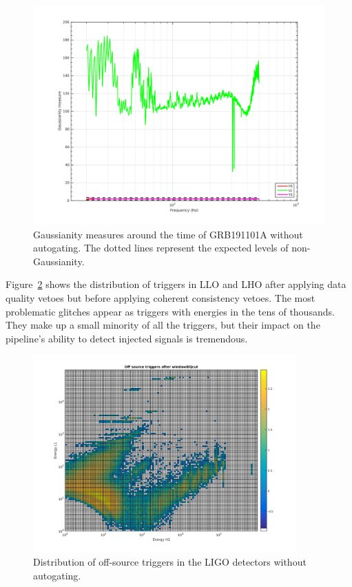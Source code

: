 \begin{figure}[htb]
	\includegraphics[trim={2cm 1.2cm 2cm 1.5cm}, clip, width=\textwidth]{figures/grb/gauss-before.png}
	\caption{Gaussianity measures around the time of GRB191101A without autogating. The dotted lines represent the expected levels of non-Gaussianity.}
	\label{fig:gauss-before}
\end{figure}

Figure~\ref{fig:triggers-before} shows the distribution of triggers in LLO and LHO after applying data quality vetoes but before applying coherent consistency vetoes.
The most problematic glitches appear as triggers with energies in the tens of thousands.
They make up a small minority of all the triggers, but their impact on the pipeline's ability to detect injected signals is tremendous.

\begin{figure}[htb]
	\includegraphics[trim={2cm 1.2cm 2cm 1.2cm}, clip, width=0.9\textwidth]{figures/grb/triggers-before.png}
	\caption{Distribution of off-source triggers in the LIGO detectors without autogating.}
	\label{fig:triggers-before}
\end{figure}

